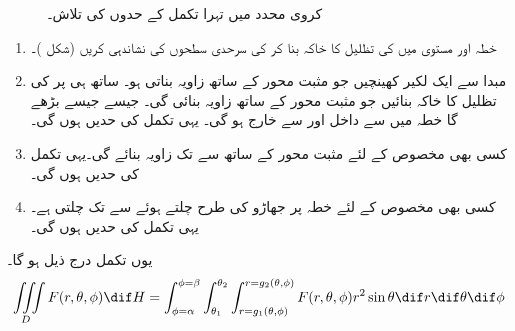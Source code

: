 \begin{figure}
\begin{subfigure}{0.50\textwidth}
\end{subfigure}%
\caption{کروی محدد میں تہرا تکمل کے حدوں کی تلاش۔}
\label{شکل_کثیر_کروی_تکمل_کے_حدوں_تلاش}
\end{figure}


\begin{enumerate}[1.]
\item
{}\quad
خطہ  اور مستوی  میں  کی تظلیل   کا خاکہ بنا کر  کی سرحدی سطحوں کی نشاندہی کریں (شکل )۔
\item
{}\quad
مبدا سے ایک لکیر  کھینچیں جو مثبت محور  کے ساتھ زاویہ  بناتی ہو۔ ساتھ ہی  پر  کی تظلیل  کا خاکہ بنائیں جو مثبت  محور کے ساتھ زاویہ  بنائی گی۔ جیسے جیسے  بڑھے گا  خطہ  میں  سے داخل اور  سے خارج ہو گی۔ یہی تکمل کی  حدیں ہوں گی۔
\item
{}\quad
کسی بھی مخصوص  کے لئے   مثبت محور  کے ساتھ  سے  تک زاویہ بنائے گی۔یہی تکمل کی  حدیں ہوں گی۔
\item
{}\quad
کسی بھی مخصوص  کے لئے    خطہ  پر جھاڑو کی طرح چلتے ہوئے  سے  تک چلتی ہے۔  یہی تکمل کی  حدیں ہوں گی۔
\end{enumerate}
یوں تکمل درج ذیل ہو گا۔
\begin{align*}
\iiint\limits_D F(r,\theta,\phi)\dif H=\int_{\phi=\alpha}^{\phi=\beta}\int_{\theta_1}^{\theta_2}\int_{r=g_1(\theta,\phi)}^{r=g_2(\theta,\phi)} F(r,\theta,\phi) r^2\sin\theta \dif r\dif \theta \dif \phi
\end{align*} 

